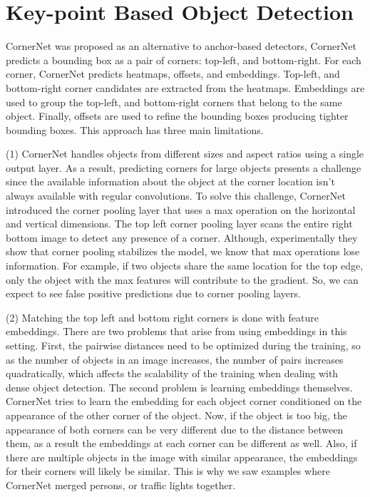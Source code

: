 \documentclass[10pt,twocolumn,letterpaper]{article}
\begin{document}
\section{Key-point Based Object Detection}
CornerNet \cite{law2018cornernet} was proposed as an alternative to anchor-based detectors, CornerNet predicts a bounding box as a pair of corners: top-left, and bottom-right. For each corner, CornerNet predicts heatmaps, offsets, and embeddings. Top-left, and bottom-right corner candidates are extracted from the heatmaps. Embeddings are used to group the top-left, and bottom-right corners that belong to the same object. Finally, offsets are used to refine the bounding boxes producing tighter bounding boxes. This approach has three main limitations. 

(1) CornerNet handles objects from different sizes and aspect ratios using a single output layer. As a result, predicting corners for large objects presents a challenge since the available information about the object at the corner location isn't always available with regular convolutions. To solve this challenge, CornerNet introduced the corner pooling layer that uses a max operation on the horizontal and vertical dimensions. The top left corner pooling layer scans the entire right bottom image to detect any presence of a corner. Although, experimentally they show that corner pooling stabilizes the model, we know that max operations lose information. For example, if two objects share the same location for the top edge, only the object with the max features will contribute to the gradient. So, we can expect to see false positive predictions due to corner pooling layers.

(2) Matching the top left and bottom right corners is done with feature embeddings. There are two problems that arise from using embeddings in this setting. First, the pairwise distances need to be optimized during the training, so as the number of objects in an image increases, the number of pairs increases quadratically, which affects the scalability of the training when dealing with dense object detection. The second problem is learning embeddings themselves. CornerNet tries to learn the embedding for each object corner conditioned on the appearance of the other corner of the object. Now, if the object is too big, the appearance of both corners can be very different due to the distance between them, as a result the embeddings at each corner can be different as well. Also, if there are multiple objects in the image with similar appearance, the embeddings for their corners will likely be similar. This is why we saw examples where CornerNet merged persons, or traffic lights together.
\end{document}
